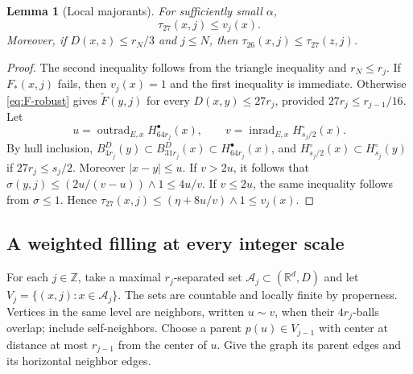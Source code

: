 \documentclass[11pt,reqno]{amsart}
\theoremstyle{plain}
\newtheorem{lemma}[theorem]{Lemma}
\theoremstyle{definition}
\theoremstyle{remark}
\newcommand{\R}{\mathbb R}
\newcommand{\inrad}{\operatorname{inrad}}
\newcommand{\outrad}{\operatorname{outrad}}
\newcommand{\1}{\mathbf{1}}
\newcommand{\bd}{B^{D}}
\begin{document}
\begin{lemma}[Local majorants]\label{lem:majorants}
For sufficiently small $\alpha$,
\begin{equation}\label{eq:majorants}
\tau_{27}(x,j)\le v_j(x).
\end{equation}
Moreover, if $D(x,z)\le r_N/3$ and $j\le N$, then $\tau_{26}(x,j)\le\tau_{27}(z,j)$.
\end{lemma}
\begin{proof}
The second inequality follows from the triangle inequality and $r_N\le r_j$. If $F_*(x,j)$ fails, then $v_j(x)=1$ and the first inequality is immediate. Otherwise \eqref{eq:F-robust} gives $\widetilde F(y,j)$ for every $D(x,y)\le27r_j$, provided $27r_j\le r_{j-1}/16$. Let
\[
u=\outrad_{E,x}H_{64r_j}^\bullet(x),\qquad
v=\inrad_{E,x}H_{s_j/2}^\circ(x).
\]
By hull inclusion, $\bd_{4r_j}(y)\subset\bd_{31r_j}(x)\subset H_{64r_j}^\bullet(x)$, and $H_{s_j/2}^\circ(x)\subset H_{s_j}^\circ(y)$ if $27r_j\le s_j/2$. Moreover $|x-y|\le u$. If $v>2u$, it follows that
$\sigma(y,j)\le (2u/(v-u))\wedge1\le4u/v$. If $v\le2u$, the same inequality follows from $\sigma\le1$. Hence
$\tau_{27}(x,j)\le(\eta+8u/v)\wedge1\le v_j(x)$.
\end{proof}

\subsection{A weighted filling at every integer scale}\label{subsec:filling}
For each $j\in\mathbb Z$, take a maximal $r_j$-separated set $\mathcal A_j\subset(\R^d,D)$ and let $V_j=\{(x,j):x\in\mathcal A_j\}$. The sets are countable and locally finite by properness. Vertices in the same level are neighbors, written $u\sim v$, when their $4r_j$-balls overlap; include self-neighbors. Choose a parent $p(u)\in V_{j-1}$ with center at distance at most $r_{j-1}$ from the center of $u$. Give the graph its parent edges and its horizontal neighbor edges.
\end{document}
